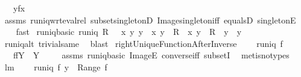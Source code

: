 \begin{isabellebody}
\ \ \ {\isachardoublequoteopen}y{\isacharequal}f{\isacharcomma}{\isacharcomma}x{\isachardoublequoteclose}\ \isanewline
%
\isadelimproof
\ \ %
\endisadelimproof
%
\isatagproof
{}\isamarkupfalse%
\ assms\ runiq{\isacharunderscore}wrt{\isacharunderscore}eval{\isacharunderscore}rel\ subset{\isacharunderscore}singletonD\ Image{\isacharunderscore}singleton{\isacharunderscore}iff\ equals{}D\ singletonE\ \isanewline
\ \ \isamarkupfalse%
\ fast%
\endisatagproof
{\isafoldproof}%
%
\isadelimproof
\isanewline
%
\endisadelimproof
\isanewline
{}\isamarkupfalse%
\ runiq{\isacharunderscore}basic{\isacharcolon}\ {\isachardoublequoteopen}runiq\ R\ {\isasymlongleftrightarrow}\ {\isacharparenleft}{\isasymforall}\ x\ y\ y{\isacharprime}\ {\isachardot}\ {\isacharparenleft}x{\isacharcomma}\ y{\isacharparenright}\ {\isasymin}\ R\ {\isasymand}\ {\isacharparenleft}x{\isacharcomma}\ y{\isacharprime}{\isacharparenright}\ {\isasymin}\ R\ {\isasymlongrightarrow}\ y\ {\isacharequal}\ y{\isacharprime}{\isacharparenright}{\isachardoublequoteclose}\ \isanewline
%
\isadelimproof
\ \ %
\endisadelimproof
%
\isatagproof
{}\isamarkupfalse%
\ runiq{\isacharunderscore}alt\ trivial{\isacharunderscore}same\ \isamarkupfalse%
\ blast%
\endisatagproof
{\isafoldproof}%
%
\isadelimproof
\isanewline
%
\endisadelimproof
\isanewline
{}\isamarkupfalse%
\ rightUniqueFunctionAfterInverse{\isacharcolon}\ \isanewline
\ \ \ {\isachardoublequoteopen}runiq\ f{\isachardoublequoteclose}\ \isanewline
\ \ \ {\isachardoublequoteopen}f{\isacharbackquote}{\isacharbackquote}{\isacharparenleft}f{\isacharcircum}{\isacharminus}{}{\isacharbackquote}{\isacharbackquote}Y{\isacharparenright}\ {\isasymsubseteq}\ Y{\isachardoublequoteclose}\ \isanewline
%
\isadelimproof
\ \ %
\endisadelimproof
%
\isatagproof
{}\isamarkupfalse%
\ assms\ runiq{\isacharunderscore}basic\ ImageE\ converse{\isacharunderscore}iff\ subsetI\ \isamarkupfalse%
\ {\isacharparenleft}metis{\isacharparenleft}no{\isacharunderscore}types{\isacharparenright}{\isacharparenright}%
\endisatagproof
{\isafoldproof}%
%
\isadelimproof
\isanewline
%
\endisadelimproof
\isanewline
{}\isamarkupfalse%
\ lm{}{}{\isacharcolon}\ \isanewline
\ \ \ {\isachardoublequoteopen}runiq\ f{\isachardoublequoteclose}\ {\isachardoublequoteopen}y{}\ {\isasymin}\ Range\ f{\isachardoublequoteclose}\ \isanewline

\end{isabellebody}
